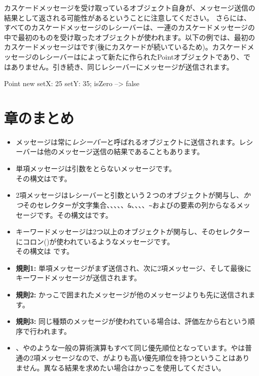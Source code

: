 \documentclass[a4paper,10pt,twoside]{book}
\begin{document}
カスケードメッセージを受け取っているオブジェクト自身が、メッセージ送信の結果として返される可能性があるということに注意してください。
さらには、すべてのカスケードメッセージのレシーバーは、一連のカスケードメッセージの中で最初のものを受け取ったオブジェクトが使われます。以下の例では、最初のカスケードメッセージはです(後にカスケードが続いているため)。カスケードメッセージのレシーバーはによって新たに作られたPointオブジェクトであり、ではありません。引き続き、同じレシーバーにメッセージが送信されます。

\begin{code}{}
Point new setX: 25 setY: 35; isZero --> false
\end{code}

\section{章のまとめ}

\begin{itemize}
\item メッセージは常に\emph{レシーバー}と呼ばれるオブジェクトに送信されます。レシーバーは他のメッセージ送信の結果であることもあります。

\item 単項メッセージは引数をとらないメッセージです。\\
その構文はです。

\item 2項メッセージはレシーバーと引数という２つのオブジェクトが関与し、\emph{かつ}そのセレクターが文字集合\ct{+}、\ct{-}、\ct{*}、\ct{/}、\ct{|}、\texttt{\&}、\ct{=}、\ct{>}、\ct{<}、\texttt{\~}およびの要素の列からなるメッセージです。その構文はです。

\item キーワードメッセージは2つ以上のオブジェクトが関与し、そのセレクターにコロン(\ct{:})が使われているようなメッセージです。\\
その構文は
です。

\item \textbf{規則1:} 単項メッセージがまず送信され、次に2項メッセージ、そして最後にキーワードメッセージが送信されます。
\item \textbf{規則2:} かっこで囲まれたメッセージが他のメッセージよりも先に送信されます。
\item \textbf{規則3:} 同じ種類のメッセージが使われている場合は、評価左から右という順序で行われます。
\item {}、\ct{+}や\ct{*}のような一般の算術演算もすべて同じ優先順位となっています。\ct{+}や\ct{*}は普通の2項メッセージなので、\ct{*}が\ct{+}よりも高い優先順位を持つということはありません。異なる結果を求めたい場合はかっこを使用してください。
\end{itemize}

\ifx\wholebook\relax\else
\end{document}
